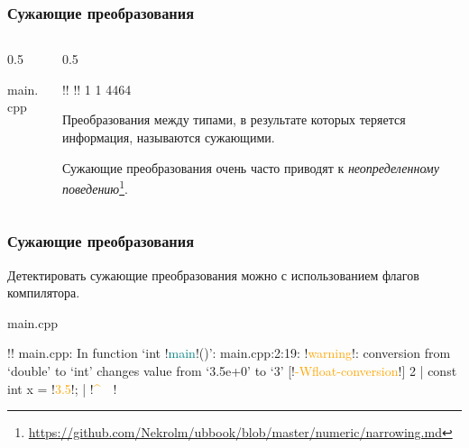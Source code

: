 \documentclass[compress, 8pt, aspectratio=169]{beamer}
\begin{document}
\begin{frame}[fragile]

    \frametitle{Сужающие преобразования}

    \begin{columns}[T]

        \begin{column}{0.5\textwidth}

                {main.cpp}

        \end{column}

        \begin{column}{0.5\textwidth}

            \begin{terminalwindow}
!!
!!
1
1
4464
            \end{terminalwindow}

            Преобразования между типами, в результате которых теряется информация,
            называются сужающими.

            \hfill\break
            Сужающие преобразования очень часто приводят к
            \textit{неопределенному поведению}\footnote{\url{https://github.com/Nekrolm/ubbook/blob/master/numeric/narrowing.md}}.

        \end{column}

    \end{columns}

\end{frame}

\begin{frame}[fragile]

    \frametitle{Сужающие преобразования}

    Детектировать сужающие преобразования можно с использованием флагов компилятора.

        {main.cpp}

    \begin{terminalwindow}
!!
main.cpp: In function ‘int !\textcolor{teal}{main}!()’:
main.cpp:2:19: !\textcolor{orange}{warning}!: conversion from ‘double’ to ‘int’ changes value from ‘3.5e+0’ to ‘3’ [!\textcolor{orange}{-Wfloat-conversion}!]
    2 |     const int x = !\textcolor{orange}{3.5}!;
      |                   !\textcolor{orange}{\^{}~~}!
    \end{terminalwindow}

\end{frame}
\end{document}
